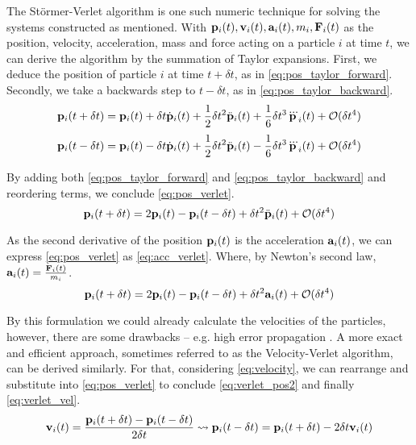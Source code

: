The Störmer-Verlet algorithm is one such numeric technique for solving the systems constructed as mentioned.
With $\mathbf{p}_i(t), \mathbf{v}_i(t), \mathbf{a}_i(t), m_i, \mathbf{F}_i(t)$ as the position, velocity, acceleration, mass and force acting on a particle $i$ at time $t$, we can derive the algorithm by the summation of Taylor expansions. First, we deduce the position of particle $i$ at time $t+\delta t$, as in \eqref{eq:pos_taylor_forward}. Secondly, we take a backwards step to $t-\delta t$, as in \eqref{eq:pos_taylor_backward}.
\begin{equation}
	\mathbf{p}_i(t+\delta t) = \mathbf{p}_i(t)+\delta t\dot{\mathbf{p}}_i(t)+\frac{1}{2}\delta t^2\ddot{\mathbf{p}}_i(t)+\frac{1}{6}\delta t^3\dddot{\mathbf{p}}_i(t)+\mathcal{O}(\delta t^4)\label{eq:pos_taylor_forward}
\end{equation}
\begin{equation}
	\mathbf{p}_i(t-\delta t) = \mathbf{p}_i(t)-\delta t\dot{\mathbf{p}}_i(t)+\frac{1}{2}\delta t^2\ddot{\mathbf{p}}_i(t)-\frac{1}{6}\delta t^3\dddot{\mathbf{p}}_i(t)+\mathcal{O}(\delta t^4)\label{eq:pos_taylor_backward}
\end{equation}

By adding both \eqref{eq:pos_taylor_forward} and \eqref{eq:pos_taylor_backward} and reordering terms, we conclude \eqref{eq:pos_verlet}.
\begin{equation}
\mathbf{p}_i(t+\delta t) = 2\mathbf{p}_i(t) - \mathbf{p}_i(t-\delta t) + \delta t^2\ddot{\mathbf{p}}_i(t) + \mathcal{O}(\delta t^4)\label{eq:pos_verlet}
\end{equation}

As the second derivative of the position $\mathbf{p}_i(t)$ is the acceleration $\mathbf{a}_i(t)$, we can express \eqref{eq:pos_verlet} as \eqref{eq:acc_verlet}. Where, by Newton's second law, $\mathbf{a}_i(t) = \frac{\mathbf{F}_i(t)}{m_i}$.
\begin{equation}
	\mathbf{p}_i(t+\delta t) = 2\mathbf{p}_i(t) - \mathbf{p}_i(t-\delta t) + \delta t^2{\mathbf{a}}_i(t) + \mathcal{O}(\delta t^4)\label{eq:acc_verlet}
\end{equation}

By this formulation we could already calculate the velocities of the particles, however, there are some drawbacks -- e.g. high error propagation \cite{Fulst2013}. A more exact and efficient approach, sometimes referred to as the Velocity-Verlet algorithm, can be derived similarly.
For that, considering \eqref{eq:velocity}, we can rearrange and substitute into \eqref{eq:pos_verlet} to conclude \eqref{eq:verlet_pos2} and finally \eqref{eq:verlet_vel}.
\begin{equation}
	\mathbf{v}_i(t) = \frac{\mathbf{p}_i(t+\delta t) -\mathbf{p}_i(t-\delta t)}{2\delta t} \rightsquigarrow \mathbf{p}_i(t-\delta t)= \mathbf{p}_i(t+\delta t)-2\delta t \mathbf{v}_i(t) \label{eq:velocity}
\end{equation}

